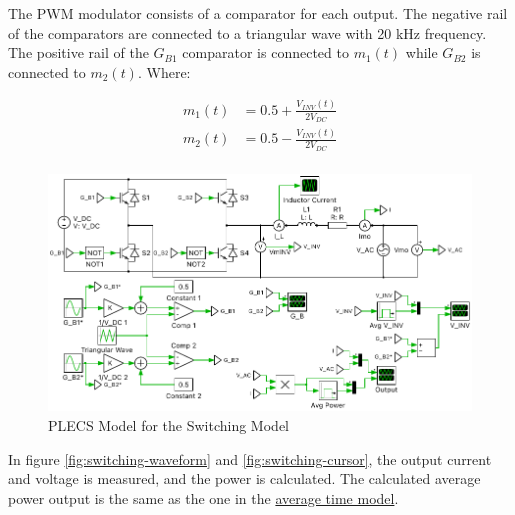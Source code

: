 \documentclass[12pt]{article}
\begin{document}
The PWM modulator consists of a comparator for each output.
The negative rail of the comparators are connected to a triangular wave with 20 kHz frequency.
The positive rail of the $G_{B1}$ comparator is connected to $m_1(t)$ while $G_{B2}$ is connected to $m_2(t)$.
Where:

\begin{equation}
    \begin{aligned}
        m_1(t) & = 0.5 + \frac{V_{INV}(t)}{2 V_{DC}} \\
        m_2(t) & = 0.5 - \frac{V_{INV}(t)}{2 V_{DC}} \\
    \end{aligned}
\end{equation}

\begin{figure}[ht]
    \centering{}
    \includegraphics[width=\textwidth, height=0.4\textheight, keepaspectratio]{img/Switching Model.pdf}
    \caption{PLECS Model for the Switching Model}
    \label{fig:switching-model}
\end{figure}

In figure \ref{fig:switching-waveform} and \ref{fig:switching-cursor}, the output current and voltage is measured, and the power is calculated.
The calculated average power output is the same as the one in the \hyperref[sec:avg-time-model]{average time model}.
\end{document}
